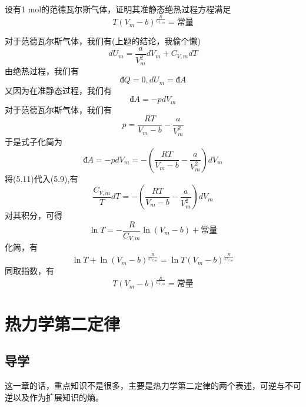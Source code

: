 \documentclass[lang=cn,10pt]{elegantbook}
\begin{document}
	 \begin{example}
	 	设有1 mol的范德瓦尔斯气体，证明其准静态绝热过程方程满足
	 	\begin{equation*}
	 		T\left( V_m-b \right) ^{\frac{R}{C_{V,m}}}=\text{常量}
	 	\end{equation*}
	 \end{example}
	 \begin{solution}
	 	对于范德瓦尔斯气体，我们有(上题的结论，我偷个懒)
	 	\begin{equation}
	 		dU_m=\frac{a}{V_{m}^{2}}dV_m+C_{V,m}dT
	 	\end{equation}
	 	由绝热过程，我们有
	 	\begin{equation*}
	 		\text{đ}Q=0,dU_{m}=\text{đ}A
	 	\end{equation*}
	 	又因为在准静态过程，我们有
	 	\begin{equation*}
	 		\text{đ}A=-pdV_{m}
	 	\end{equation*}
	 	对于范德瓦尔斯气体，我们有
	 	\begin{equation}
	 		p=\frac{RT}{V_m-b}-\frac{a}{V_{m}^{2}}
	 	\end{equation}
	 	于是式子化简为
	 	\begin{equation}
	 	\text{đ}A=-pdV_{m}=-(\frac{RT}{V_m-b}-\frac{a}{V_{m}^{2}})dV_{m}
	 	\end{equation}
	 	将(5.11)代入(5.9),有
	 	\begin{equation*}
	 		\frac{C_{V,m}}{T}dT=-\left( \frac{RT}{V_m-b}-\frac{a}{V_{m}^{2}} \right) dV_m
	 	\end{equation*}
	 	对其积分，可得
	 	\begin{equation*}
	 		\ln T=-\frac{R}{C_{V,m}}\ln(V_m-b)+\text{常量}
	 	\end{equation*}
	 	化简，有
	 	\begin{equation*}
	 		\ln T+\ln \left( V_m-b \right) ^{\frac{R}{C_{V,m}}}=\ln T\left( V_m-b \right) ^{\frac{R}{C_{V,m}}}
	 	\end{equation*}
	 	同取指数，有
	 	\begin{equation*}
	 		T\left( V_m-b \right) ^{\frac{R}{C_{V,m}}}=\text{常量}
	 	\end{equation*}
	 \end{solution}
	\chapter{热力学第二定律}
	\section{导学}
	这一章的话，重点知识不是很多，主要是热力学第二定律的两个表述，可逆与不可逆以及作为扩展知识的熵。
\end{document}
